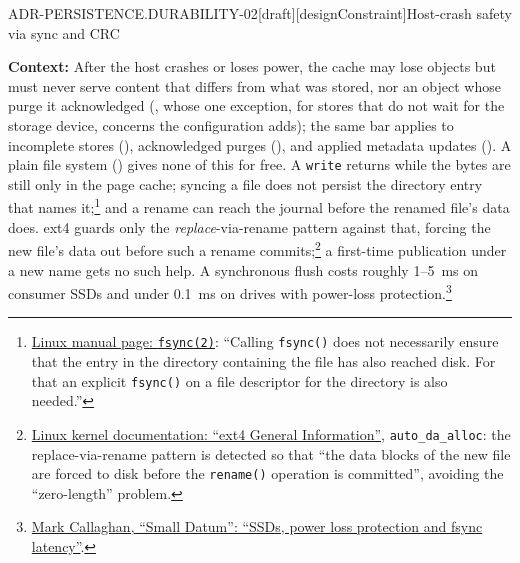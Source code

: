 \begin{requirement}{ADR-PERSISTENCE.DURABILITY-02}[draft][designConstraint]{Host-crash safety via sync and CRC}


  \textbf{Context:} After the host crashes or loses power, the cache may lose
  objects but must never serve content that differs from what was stored,
  nor an object whose purge it acknowledged
  (, whose one exception, for stores
  that do not wait for the storage device, concerns the configuration
   adds); the same bar applies to
  incomplete stores (), acknowledged
  purges (), and applied metadata updates
  (). A plain file system
  () gives none of this for free. A
  \texttt{write} returns while the bytes are still only in the page cache;
  syncing a file does not persist the directory entry that names
  it;\footnote{\href{https://man7.org/linux/man-pages/man2/fsync.2.html}{Linux
  manual page: \texttt{fsync(2)}}: ``Calling \texttt{fsync()} does not
  necessarily ensure that the entry in the directory containing the file has
  also reached disk. For that an explicit \texttt{fsync()} on a file
  descriptor for the directory is also needed.''} and a rename can reach the
  journal before the renamed file's data does. ext4 guards only the
  \emph{replace}-via-rename pattern against that, forcing the new file's data
  out before such a rename commits;\footnote{\href{https://www.kernel.org/doc/html/latest/admin-guide/ext4.html}{Linux
  kernel documentation: ``ext4 General Information''}, \texttt{auto\_da\_alloc}:
  the replace-via-rename pattern is detected so that ``the data blocks of the
  new file are forced to disk before the \texttt{rename()} operation is
  committed'', avoiding the ``zero-length'' problem.} a first-time publication
  under a new name gets no such help. A synchronous flush costs roughly
  1--5~ms on consumer SSDs and under 0.1~ms on drives with power-loss
  protection.\footnote{\href{https://smalldatum.blogspot.com/2026/01/ssds-power-loss-protection-and-fsync.html}{Mark
  Callaghan, ``Small Datum'': ``SSDs, power loss protection and fsync
  latency''}.}


\end{requirement}
